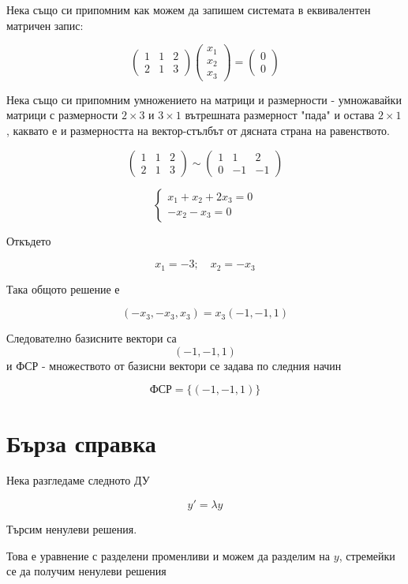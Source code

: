 \documentclass{scrartcl}
\begin{document}
Нека също си припомним как можем да запишем системата в еквивалентен матричен запис:

$$
\begin{pmatrix}
    1 & 1 & 2\\
    2 & 1 & 3
\end{pmatrix}
\begin{pmatrix}
    x_1\\x_2\\x_3
\end{pmatrix}
=
\begin{pmatrix}
    0\\0
\end{pmatrix}
$$

Нека също си припомним умножението на матрици и размерности - умножавайки матрици с размерности $2\times 3$ и $3\times 1$ вътрешната размерност "пада" и остава $2\times 1$, каквато е и размерността на вектор-стълбът от дясната страна на равенството.

$$
\begin{pmatrix}
    1 & 1 & 2\\
    2 & 1 & 3
\end{pmatrix}
\sim
\begin{pmatrix}
    1 & 1 & 2\\
    0 & -1 & -1
\end{pmatrix}
$$

$$
\begin{cases}
    x_1+x_2+2x_3=0\\
    -x_2 - x_3=0
\end{cases}
$$

Откъдето

$$x_1 = -3; \quad x_2 = -x_3$$

Така общото решение е

$$(-x_3, -x_3, x_3) = x_3(-1, -1, 1)$$

Следователно базисните вектори са $$(-1, -1, 1)$$ и ФСР - множеството от базисни вектори се задава по следния начин

$$\text{ФСР} = \{(-1, -1, 1)\}$$

\section{Бърза справка}

Нека разгледаме следното ДУ

$$y' = \lambda y$$

Търсим ненулеви решения.

Това е уравнение с разделени променливи и можем да разделим на $y$, стремейки се да получим ненулеви решения
\end{document}
